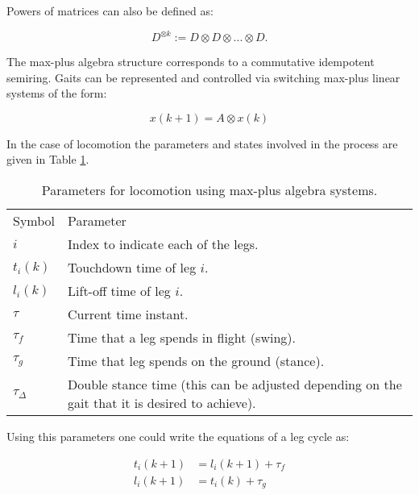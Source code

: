 \documentclass[main.tex]{subfiles}
\begin{document}
	
	Powers of matrices can also be defined as:
	
	\begin{equation}
		D^{\otimes k} := D \otimes D \otimes... \otimes D.
	\end{equation}
	
	The max-plus algebra structure corresponds to a commutative idempotent semiring. Gaits can be represented and controlled via switching max-plus linear systems of the form:
	
	\begin{equation}
		x (k+1) = A \otimes x(k)
	\end{equation}
	
	In the case of locomotion the parameters and states involved in the process are given in Table \ref{table:Parameters}.
	
	\begin{table}[ht]
		\centering
		\caption{Parameters for locomotion using max-plus algebra systems\cite{Lopes2009}.}
		\label{table:Parameters}
		\begin{tabular}{ll}
			Symbol        & Parameter                                                                                      \\
			$i$           & Index to indicate each of the legs.                                                            \\
			$t_i (k)$     & Touchdown time of leg $i$.                                                                     \\
			$l_i (k)$     & Lift-off time of leg $i$.                                                                      \\
			$\tau$        & Current time instant.                                                                          \\
			$\tau_f$      & Time that a leg spends in flight (swing).                                                             \\
			$\tau_g$      & Time that leg spends on the ground (stance).                                                        \\
			$\tau_\Delta$ & Double stance time (this can be adjusted depending on the gait that it is desired to achieve).
		\end{tabular}
	\end{table}
	
	Using this parameters one could write the equations of a leg cycle as:
	
	\begin{align}
		t_i (k+1) &= l_i (k+1) + \tau_f \\
		l_i (k+1) &= t_i (k) + \tau_g \label{eq:liftoff}
	\end{align}
	
\end{document}
